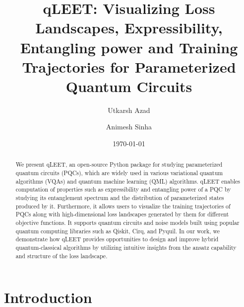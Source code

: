 \documentclass[%
 reprint,
 amsmath,
 amssymb,
 showkeys,
 pra,
 floatfix,
]{revtex4-2}
\begin{document}

\title{qLEET: Visualizing Loss Landscapes, Expressibility, Entangling power and Training Trajectories for Parameterized Quantum Circuits}

\author{Utkarsh Azad}
\author{Animesh Sinha}

%

\date{\today}%

\begin{abstract}

    We present qLEET, an open-source Python package for studying parameterized quantum circuits (PQCs), which are widely used in various variational quantum algorithms (VQAs) and quantum machine learning (QML) algorithms. qLEET enables computation of properties such as expressibility and entangling power of a PQC by studying its entanglement spectrum and the distribution of parameterized states produced by it. Furthermore, it allows users to visualize the training trajectories of PQCs along with high-dimensional loss landscapes generated by them for different objective functions. It supports quantum circuits and noise models built using popular quantum computing libraries such as Qiskit, Cirq, and Pyquil. In our work, we demonstrate how qLEET provides opportunities to design and improve hybrid quantum-classical algorithms by utilizing intuitive insights from the ansatz capability and structure of the loss landscape.

\end{abstract}

\maketitle


\section{\label{sec:intro}Introduction}
\end{document}
